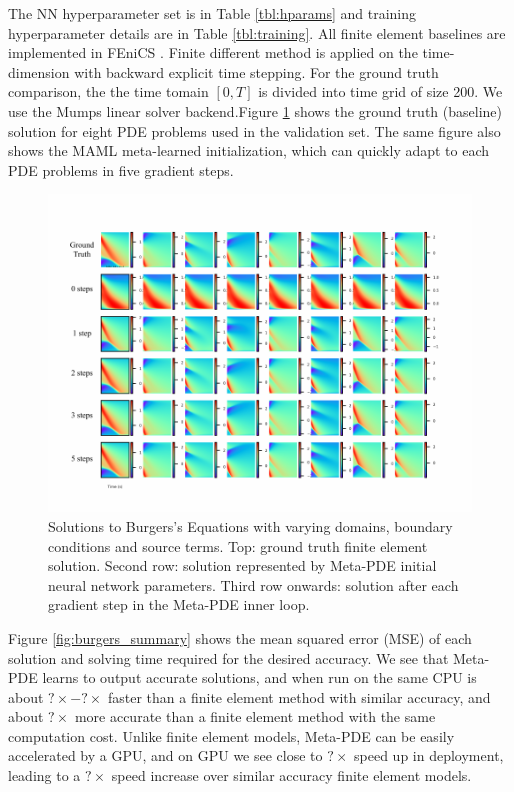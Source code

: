 The NN hyperparameter set is in Table \ref{tbl:hparams} and training hyperparameter details are in Table \ref{tbl:training}. All finite element baselines are implemented in FEniCS \citep{LoggMardalEtAl2012a,AlnaesBlechta2015a}. Finite different method is applied on the time-dimension with backward explicit time stepping. For the ground truth comparison, the the time tomain $[0, T]$ is divided into time grid of size 200. We use the Mumps linear solver backend.Figure \ref{fig:burgers_per_step} shows the ground truth (baseline) solution for eight PDE problems used in the validation set. The same figure also shows the MAML meta-learned initialization, which can quickly adapt to each PDE problems in five gradient steps. 

\begin{figure}[htbp]
  \centering
\includegraphics[width=0.8\linewidth]{figures/burgers_meta.pdf}
\caption{Solutions to Burgers's Equations with varying domains, boundary conditions and source terms. Top: ground truth finite element solution. Second row: solution represented by Meta-PDE initial neural network parameters. Third row onwards: solution after each gradient step in the Meta-PDE inner loop.}
\label{fig:burgers_per_step}
\end{figure}

Figure \ref{fig:burgers_summary} shows the mean squared error (MSE) of each solution and solving time required for the desired accuracy. We see that Meta-PDE learns to output accurate solutions, and when run on the same CPU is about $?\times - ?\times$ faster than a finite element method with similar accuracy, and about $?\times$ more accurate than a finite element method with the same computation cost. Unlike finite element models, Meta-PDE can be easily accelerated by a GPU, and on GPU we see close to $?\times$ speed up in deployment, leading to a $?\times$ speed increase over similar accuracy finite element models.


